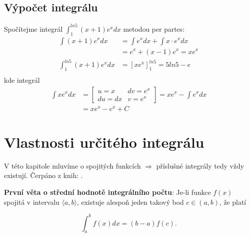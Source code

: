   \subsection{Výpočet integrálu}
      \begin{example}
        Spočítejme integrál $\displaystyle \int_1^{ln5}{(x+1)e^xdx}$  metodou per partes: 
        \begin{align*}
          \int{(x+1)e^xdx} &= \int{e^xdx}+\int{x\cdot e^xdx}     \\
                           &= e^x + (x-1)e^x = xe^x              \\
          \int_1^{ln5}{(x+1)e^xdx} &= [xe^x]_1^{ln5} = 5ln5-e    \\
        \end{align*}
        kde integrál
        \begin{align*}
            \int{xe^xdx}
              &=\left[\begin{array}{cc}
                  u=x   & dv=e^x \\ [-1em]
                  du=dx & v=e^x
                \end{array}\right]= xe^x-\int{e^xdx}  \\
              &= xe^x - e^x+C
        \end{align*}
      \end{example}

\section{Vlastnosti určitého integrálu}
  V této kapitole mluvíme o spojitých funkcích $\Rightarrow$ příslušné integrály tedy vždy
  existují. Čerpáno z knih:
  \cite{Knichal}.

  \begin{lemma}
    \textbf{První věta o střední hodnotě integrálního počtu}: Je-li funkce \(f(x)\) spojitá v
    intervalu $\langle a, b\rangle$, existuje alespoň jeden takový bod $c\in(a, b)$, že platí

    \begin{equation}\label{MA:eq_av1}
      \int_a^b f(x)dx = (b-a)f(c).
    \end{equation}
  \end{lemma}

